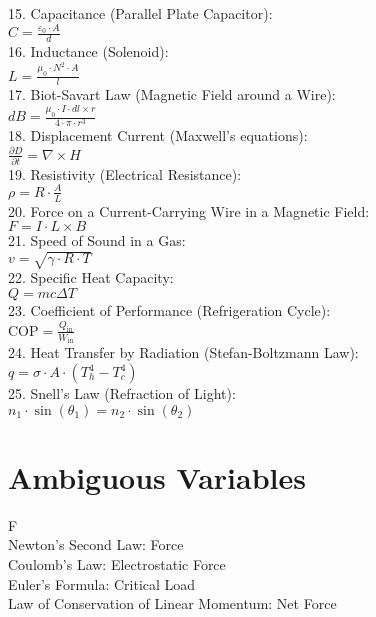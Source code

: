 \documentclass{article}
\begin{document}
\begin{multicols}{2}
15. Capacitance (Parallel Plate Capacitor): \\
    \( C = \frac{\varepsilon_0 \cdot A}{d} \) \\
16. Inductance (Solenoid): \\
    \( L = \frac{\mu_0 \cdot N^2 \cdot A}{l} \) \\
17. Biot-Savart Law (Magnetic Field around a Wire): \\
    \( dB = \frac{\mu_0 \cdot I \cdot dl \times r}{4 \cdot \pi \cdot r^3} \) \\
18. Displacement Current (Maxwell's equations): \\
    \( \frac{\partial D}{\partial t} = \nabla \times H \) \\
19. Resistivity (Electrical Resistance): \\
    \( \rho = R \cdot \frac{A}{L} \) \\
20. Force on a Current-Carrying Wire in a Magnetic Field: \\
    \( F = I \cdot L \times B \) \\
21. Speed of Sound in a Gas: \\
    \( v = \sqrt{\gamma \cdot R \cdot T} \) \\
22. Specific Heat Capacity: \\
    \( Q = mc\Delta T \) \\
23. Coefficient of Performance (Refrigeration Cycle): \\
    \( \text{COP} = \frac{Q_{\text{in}}}{W_{\text{in}}} \) \\
24. Heat Transfer by Radiation (Stefan-Boltzmann Law): \\
    \( q = \sigma \cdot A \cdot (T_h^4 - T_c^4) \) \\
25. Snell's Law (Refraction of Light): \\
    \( n_1 \cdot \sin(\theta_1) = n_2 \cdot \sin(\theta_2) \) \\
\newpage
\vfill\eject
\section*{Ambiguous Variables}


F \\

    Newton's Second Law: Force \\
    Coulomb's Law: Electrostatic Force \\
    Euler's Formula: Critical Load \\
    Law of Conservation of Linear Momentum: Net Force \\


\end{multicols}
\end{document}
